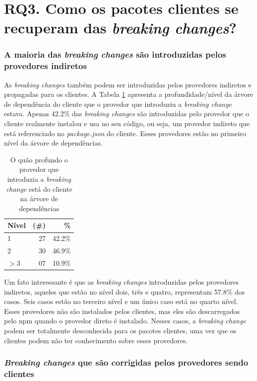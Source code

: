 \section{RQ3. Como os pacotes clientes se recuperam das \textit{breaking changes}?}

\subsubsection{A maioria das \textit{breaking changes} são introduzidas pelos provedores indiretos}

As \textit{breaking changes} também podem ser introduzidas pelos provedores indiretos e propagadas para os clientes. A Tabela \ref{tab:dependency_tree_deep} apresenta a profundidade/nível da árvore de dependência do cliente que o provedor que introduziu a \textit{breaking change} estava. Apenas 42.2\% das \textit{breaking changes} são introduzidas pelo provedor que o cliente realmente instalou e usa no seu código, ou seja, um provedor indireto que está referenciado no \textit{package.json} do cliente. Esses provedores estão no primeiro nível da árvore de dependências.

\begin{table}
	\centering
	\caption{O quão profundo o provedor que introduzia a \textit{breaking change} está do cliente na árvore de dependências}
	\begin{tabular}{lrr}
		\toprule
		\textbf{Nível} & (\#) & \textbf{\%} \\ \hline
		1              & 27   & 42.2\%       \\
		2              & 30   & 46.9\%       \\
		$>$3           & 07   & 10.9\%       \\ \bottomrule
	\end{tabular}
	\label{tab:dependency_tree_deep}
\end{table}

Um fato interessante é que as \textit{breaking changes} introduzidas pelos provedores indiretos, aqueles que estão no nível dois, três e quatro, representam 57.8\% dos casos. Seis casos estão no terceiro nível e um único caso está no quarto nível. Esses provedores não são instalados pelos clientes, mas eles são descarregados pelo \textsf{npm} quando o provedor direto é instalado. Nesses casos, a \textit{breaking change} podem ser totalmente desconhecida para os pacotes clientes, uma vez que os clientes podem não ter conhecimento sobre esses provedores.

\subsubsection{\textit{Breaking changes} que são corrigidas pelos provedores sendo clientes}

